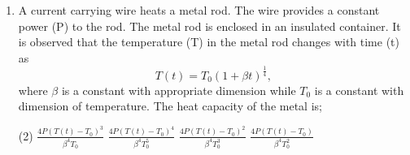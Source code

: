 
\begin{enumerate}
    \item A current carrying wire heats a metal rod. The wire provides a constant power (P) to the rod. The metal rod is enclosed in an insulated container. It is observed that the temperature (T) in the metal rod changes with time (t) as
    \[
    T(t) = T_0(1 + \beta t)^{\frac{1}{4}},
    \]
    where \(\beta\) is a constant with appropriate dimension while \(T_0\) is a constant with dimension of temperature. The heat capacity of the metal is;
        \begin{tasks}(2)
            \task \(\frac{4P(T(t)-T_0)^3}{\beta^4 T_0}\)
            \task \(\frac{4P(T(t)-T_0)^4}{\beta^4 T_0^5}\)
            \task \(\frac{4P(T(t)-T_0)^2}{\beta^4 T_0^3}\)
            \task \(\frac{4P(T(t)-T_0)}{\beta^4 T_0^2}\)
        \end{tasks}
\end{enumerate}
